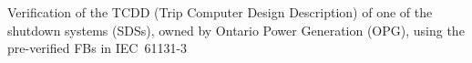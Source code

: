 \documentclass[a0,landscape]{a0poster}
\begin{document}
\begin{multicols}{4}
\noindent Verification of the TCDD (Trip Computer Design Description) of one of the shutdown systems (SDSs), owned by Ontario Power Generation (OPG), using the pre-verified FBs in IEC~61131-3


\nocite{*} %
\renewcommand{\refname}{{\normalsize \color{Blue} References}}
{\small

} 

\end{multicols}
\end{document}
